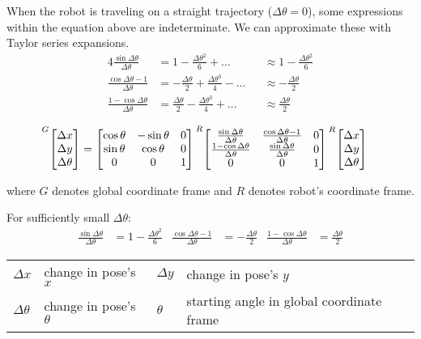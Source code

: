 When the robot is traveling on a straight trajectory ($\Delta\theta = 0$), some
expressions within the equation above are indeterminate. We can approximate
these with Taylor series expansions.
\begin{alignat*}{4}
  \frac{\sin\Delta\theta}{\Delta\theta}
    &= 1 - \frac{\Delta\theta^2}{6} + \ldots
    &&\approx 1 - \frac{\Delta\theta^2}{6} \\
  \frac{\cos\Delta\theta - 1}{\Delta\theta}
    &= -\frac{\Delta\theta}{2} + \frac{\Delta\theta^3}{4} - \ldots
    &&\approx -\frac{\Delta\theta}{2} \\
  \frac{1 - \cos\Delta\theta}{\Delta\theta}
    &= \frac{\Delta\theta}{2} - \frac{\Delta\theta^3}{4} + \ldots
    &&\approx \frac{\Delta\theta}{2}
\end{alignat*}
\begin{theorem}
  \begin{align}
    \prescript{G}{}{\begin{bmatrix}
      \Delta x \\
      \Delta y \\
      \Delta \theta
    \end{bmatrix}} &=
    \begin{bmatrix}
      \cos\theta & -\sin\theta & 0 \\
      \sin\theta &  \cos\theta & 0 \\
               0 &           0 & 1
    \end{bmatrix}
    \prescript{R}{}{\begin{bmatrix}
      \frac{\sin\Delta\theta}{\Delta\theta} &
        \frac{\cos\Delta\theta - 1}{\Delta\theta} & 0 \\
      \frac{1 - \cos\Delta\theta}{\Delta\theta} &
        \frac{\sin\Delta\theta}{\Delta\theta} & 0 \\
      0 & 0 & 1
    \end{bmatrix}}
    \prescript{R}{}{\begin{bmatrix}
      \Delta x \\
      \Delta y \\
      \Delta\theta
    \end{bmatrix}}
  \end{align}

  where $G$ denotes global coordinate frame and $R$ denotes robot's coordinate
  frame.

  For sufficiently small $\Delta\theta$:
  \begin{align}
    \frac{\sin\Delta\theta}{\Delta\theta} &= 1 - \frac{\Delta\theta^2}{6} &
    \frac{\cos\Delta\theta - 1}{\Delta\theta} &= -\frac{\Delta\theta}{2} &
    \frac{1 - \cos\Delta\theta}{\Delta\theta} &= \frac{\Delta\theta}{2}
  \end{align}
  \begin{figurekey}
    \begin{tabular}{llll}
      $\Delta x$ & change in pose's $x$ & $\Delta y$ & change in pose's $y$ \\
      $\Delta \theta$ & change in pose's $\theta$ & $\theta$ & starting angle in
        global coordinate frame
    \end{tabular}
  \end{figurekey}


\end{theorem}

